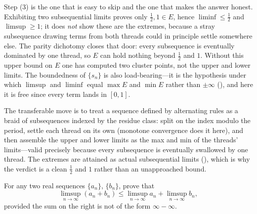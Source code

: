 \documentclass[main.tex]{subfiles}
\begin{document}
\begin{Reflection}
Step (3) is the one that is easy to skip and the one that makes the answer honest. Exhibiting two
subsequential limits proves only $\tfrac12,1\in E$, hence $\liminf\le\tfrac12$ and $\limsup\ge1$; it
does \emph{not} show these are the extremes, because a stray subsequence drawing terms from both
threads could in principle settle somewhere else. The parity dichotomy closes that door: every
subsequence is eventually dominated by one thread, so $E$ can hold nothing beyond $\tfrac12$ and $1$.
Without this upper bound on $E$ one has computed two cluster points, not the upper and lower limits.
The boundedness of $\{s_n\}$ is also load-bearing---it is the hypothesis under which $\limsup$ and
$\liminf$ equal $\max E$ and $\min E$ rather than $\pm\infty$ (), and here it is free
since every term lands in $[0,1]$.

The transferable move is to treat a sequence defined by alternating rules as a braid of subsequences
indexed by the residue class: split on the index modulo the period, settle each thread on its own
(monotone convergence does it here), and then assemble the upper and lower limits as the max and min
of the threads' limits---valid precisely because every subsequence is eventually swallowed by one
thread. The extremes are attained as actual subsequential limits (), which is why the
verdict is a clean $\tfrac12$ and $1$ rather than an unapproached bound.
\end{Reflection}

For any two real sequences $\{a_{n}\}$, $\{b_{n}\}$, prove that
\[
\limsup_{n\to\infty} (a_{n} + b_{n}) \leq \limsup_{n\to\infty} a_{n} + \limsup_{n\to\infty} b_{n},
\]
provided the sum on the right is not of the form $\infty - \infty$.
\end{document}
